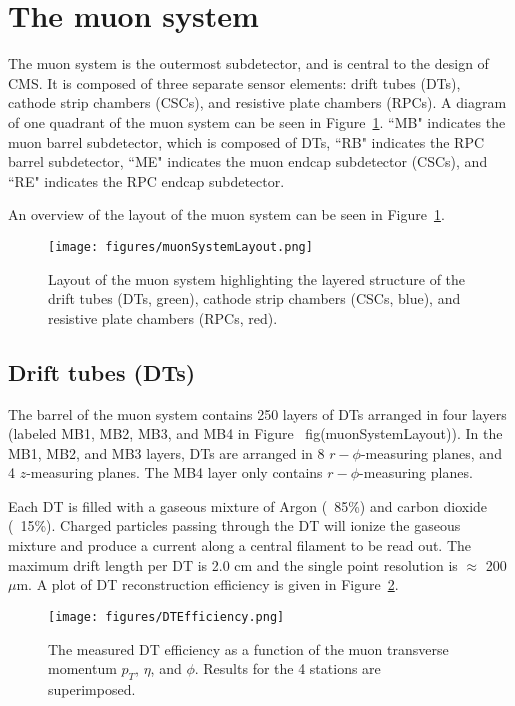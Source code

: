 \section{The muon system}

The muon system is the outermost subdetector, and is central to the design of CMS. It is composed of three separate sensor elements: drift tubes (DTs), cathode strip chambers (CSCs), and resistive plate chambers (RPCs). A diagram of one quadrant of the muon system can be seen in Figure~\ref{fig:muonSystemLayout}. ``MB" indicates the muon barrel subdetector, which is composed of DTs, ``RB" indicates the RPC barrel subdetector, ``ME" indicates the muon endcap subdetector (CSCs), and ``RE" indicates the RPC endcap subdetector. 

An overview of the layout of the muon system can be seen in Figure~\ref{fig:muonSystemLayout}.

\begin{figure}\centering
  \texttt{[image: figures/muonSystemLayout.png]}
  \caption{\label{fig:muonSystemLayout} Layout of the muon system highlighting the layered structure of the drift tubes (DTs, green), cathode strip chambers (CSCs, blue), and resistive plate chambers (RPCs, red).}
\end{figure}

\subsection{Drift tubes (DTs)}

The barrel of the muon system contains 250 layers of DTs arranged in four layers (labeled MB1, MB2, MB3, and MB4 in Figure ~fig(muonSystemLayout)). In the MB1, MB2, and MB3 layers, DTs are arranged in 8 $r-\phi$-measuring planes, and 4 $z$-measuring planes. The MB4 layer only contains $r-\phi$-measuring planes.

Each DT is filled with a gaseous mixture of Argon (~85\%) and carbon dioxide (~15\%). Charged particles passing through the DT will ionize the gaseous mixture and produce a current along a central filament to be read out. The maximum drift length per DT is 2.0 cm and the single point resolution is $\approx$ 200 $\mu$m. A plot of DT reconstruction efficiency is given in Figure~\ref{fig:DTEfficiency}.\cite{TDR}

\begin{figure}\centering
  \texttt{[image: figures/DTEfficiency.png]}
  \caption{\label{fig:DTEfficiency} The measured DT efficiency as a function of the muon transverse momentum $p_T$,
$\eta$, and $\phi$. Results for the 4 stations are superimposed.}
\end{figure}

